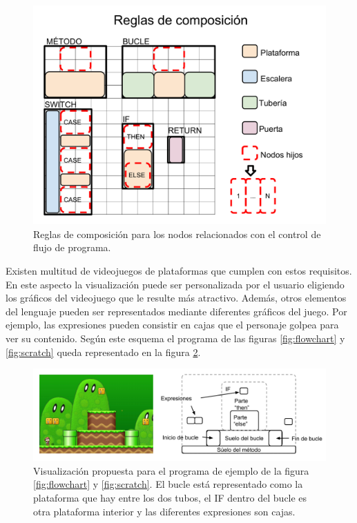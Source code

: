 \documentclass{llncs}
\begin{document}
\begin{figure}[ht]
\begin{center}
\includegraphics[scale=0.2]{images/nodos2.pdf}
\caption{Reglas de composición para los nodos relacionados con el control de flujo de programa.
\label{fig:rules}}
\end{center}
\end{figure}

Existen multitud de videojuegos de plataformas que cumplen con estos requisitos. En este aspecto la visualización puede ser personalizada por el usuario eligiendo los gráficos del videojuego que le resulte más atractivo. Además, otros elementos del lenguaje pueden ser representados mediante diferentes gráficos del juego. Por ejemplo, las expresiones pueden consistir en cajas que el personaje golpea para ver su contenido. Según este esquema el programa de las figuras \ref{fig:flowchart} y \ref{fig:scratch} queda representado en la figura \ref{fig:flowchartgame}.

\begin{figure}[ht]
\begin{center}
\includegraphics[scale=0.4]{images/flowchartgame2.pdf}
\caption{Visualización propuesta para el programa de ejemplo de la figura \ref{fig:flowchart} y \ref{fig:scratch}. El bucle está representado como la plataforma que hay entre los dos tubos, el IF dentro del bucle es otra plataforma interior y las diferentes expresiones son cajas.
\label{fig:flowchartgame}}
\end{center}
\end{figure}
\end{document}
